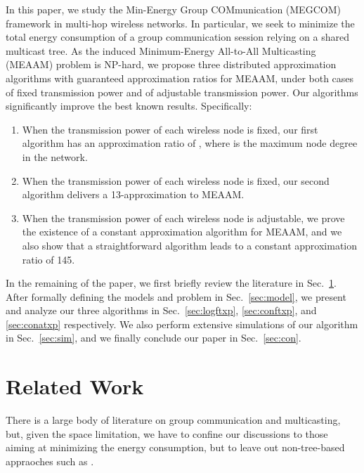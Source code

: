 \documentclass[10pt, conference, compsocconf]{IEEEtran}
\begin{document}
  In this paper, we study the Min-Energy Group COMmunication (MEGCOM) framework in multi-hop wireless networks. In particular, we seek to minimize the total energy consumption of a group communication session relying on a shared multicast tree. As the induced Minimum-Energy All-to-All Multicasting (MEAAM) problem is NP-hard, we propose three distributed approximation algorithms with guaranteed approximation ratios for MEAAM, under both cases of fixed transmission power and of adjustable transmission power. Our algorithms significantly improve the best known results. Specifically:
\begin{enumerate}
\item When the transmission power of each wireless node is fixed, our first algorithm has an approximation ratio of , where  is the maximum node degree in the network. \item When the transmission power of each wireless node is fixed, our second algorithm delivers a 13-approximation to MEAAM. \item When the transmission power of each wireless node is adjustable, we prove the existence of a constant approximation algorithm for MEAAM, and we also show that a straightforward algorithm leads to a constant approximation ratio of 145. \end{enumerate}

  In the remaining of the paper, we first briefly review the literature in Sec.~\ref{sec:rlw}. After formally defining the models and problem in Sec.~\ref{sec:model}, we present and analyze our three algorithms in Sec.~\ref{sec:logftxp}, \ref{sec:conftxp}, and \ref{sec:conatxp} respectively. We also perform extensive simulations of our algorithm in Sec.~\ref{sec:sim}, and we finally conclude our paper in Sec.~\ref{sec:con}.

\section{Related Work} \label{sec:rlw}
There is a large body of literature on group communication and multicasting, but, given the space limitation, we have to confine our discussions to those aiming at minimizing the energy consumption, but to leave out non-tree-based appraoches such as \cite{LeeSM-MONET02,TavliH-TC11}.
\end{document}
